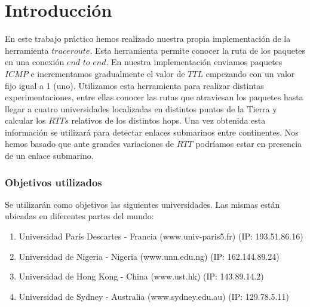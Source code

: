 \section{Introducción}

En este trabajo práctico hemos realizado nuestra propia implementación de la herramienta $traceroute$.
Esta herramienta permite conocer la ruta de los paquetes en una conexión $end$ $to$ $end$. 
En nuestra implementación enviamos paquetes $ICMP$ e incrementamos gradualmente el valor de $TTL$ empezando con un valor fijo igual a 1 (uno). 
Utilizamos esta herramienta para realizar distintas experimentaciones, entre ellas conocer las rutas que atraviesan los paquetes hasta 
llegar a cuatro universidades localizadas en distintos puntos de la Tierra y calcular los $RTTs$ relativos de los distintos hops.
Una vez obtenida esta información se utilizará para detectar enlaces submarinos entre continentes. Nos hemos basado que ante grandes variaciones
de $RTT$ podríamos estar en presencia de un enlace submarino.

\subsubsection{Objetivos utilizados}
Se utilizarán como objetivos las siguientes universidades. Las mismas están ubicadas en diferentes partes del mundo:
\begin{enumerate}
\item Universidad París Descartes - Francia (www.univ-paris5.fr) (IP: 193.51.86.16)
\item Universidad de Nigeria - Nigeria (www.unn.edu.ng) (IP: 162.144.89.24)
\item Universidad de Hong Kong - China (www.ust.hk) (IP: 143.89.14.2)
\item Universidad de Sydney - Australia (www.sydney.edu.au) (IP: 129.78.5.11)
\end{enumerate}


